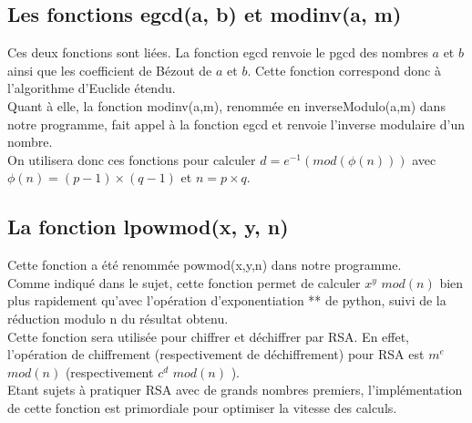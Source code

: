 \documentclass[12pt]{article}
\theoremstyle{definition}
\begin{document}
	\subsection{Les fonctions egcd(a, b) et modinv(a, m)}
	Ces deux fonctions sont liées. La fonction egcd renvoie le pgcd des nombres $a$ et $b$ ainsi que les coefficient de Bézout de $a$ et $b$. Cette fonction correspond donc à l'algorithme d'Euclide étendu.\\
	Quant à elle, la fonction modinv(a,m), renommée en inverseModulo(a,m) dans notre programme, fait appel à la fonction egcd et renvoie l'inverse modulaire d'un nombre.\\
	On utilisera donc ces fonctions pour calculer $d=e^{-1}  (mod(\phi (n)))$ avec $\phi(n) = (p-1) \times (q-1)$ et $n = p \times q$.
	 \subsection{La fonction lpowmod(x, y, n)}
Cette fonction a été renommée powmod(x,y,n) dans notre programme.\\
	 Comme indiqué dans le sujet, cette fonction permet de calculer $x^y$ $mod(n)$ bien plus rapidement qu'avec l'opération d'exponentiation ** de python, suivi de la réduction modulo n du résultat obtenu.\\
	 Cette fonction sera utilisée pour chiffrer et déchiffrer par RSA. En effet, l'opération de chiffrement (respectivement de déchiffrement) pour RSA est $m^e$ $mod(n)$ (respectivement $c^d$ $mod(n)$ ).\\
	 Etant sujets à pratiquer RSA avec de grands nombres premiers, l'implémentation de cette fonction est primordiale pour optimiser la vitesse des calculs.
\end{document}
